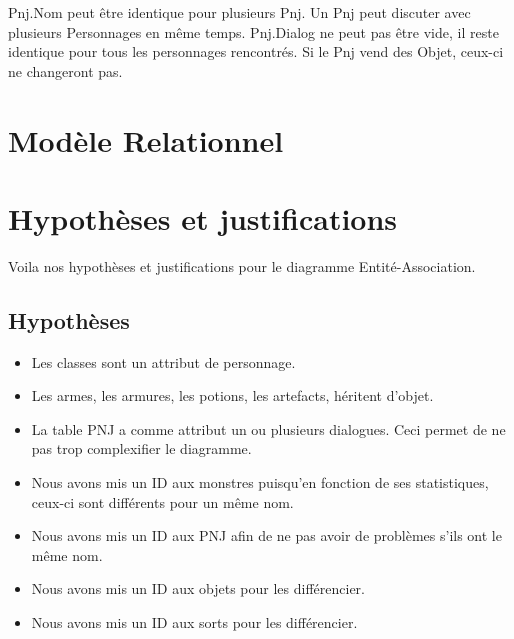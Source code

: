 \documentclass[utf8]{article}
\begin{document}
Pnj.Nom peut être identique pour plusieurs Pnj.
Un Pnj peut discuter avec plusieurs Personnages en même temps.
Pnj.Dialog ne peut pas être vide, il reste identique pour tous les personnages rencontrés.
Si le Pnj vend des Objet, ceux-ci ne changeront pas.


\section{Modèle Relationnel}

\section{Hypothèses et justifications}
Voila nos hypothèses et justifications pour le diagramme Entité-Association.
\subsection{Hypothèses}
\begin{itemize}
    \item Les classes sont un attribut de personnage.
    \item Les armes, les armures, les potions, les artefacts, héritent d'objet.
    \item La table PNJ a comme attribut un ou plusieurs dialogues. Ceci permet de ne pas trop complexifier le diagramme.
    \item Nous avons mis un ID aux monstres puisqu'en fonction de ses statistiques, ceux-ci sont différents pour un même nom.
    \item Nous avons mis un ID aux PNJ afin de ne pas avoir de problèmes s'ils ont le même nom.
    \item Nous avons mis un ID aux objets pour les différencier.
    \item Nous avons mis un ID aux sorts pour les différencier.
\end{itemize}
\end{document}
